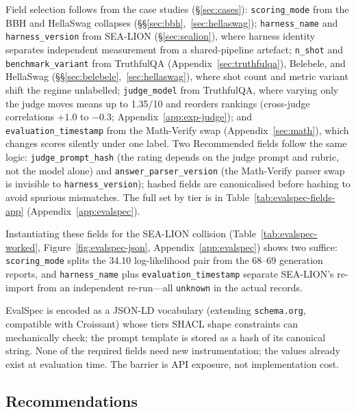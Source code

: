 \documentclass[11pt]{article}
\begin{document}
Field selection follows from the case studies (\S\ref{sec:cases}):
\texttt{scoring\_mode} from the BBH and HellaSwag collapses
(\S\S\ref{sec:bbh},~\ref{sec:hellaswag}); \texttt{harness\_name} and
\texttt{harness\_version} from SEA-LION (\S\ref{sec:sealion}), where harness
identity separates independent measurement from a shared-pipeline artefact;
\texttt{n\_shot} and \texttt{benchmark\_variant} from TruthfulQA
(Appendix~\ref{sec:truthfulqa}), Belebele, and HellaSwag
(\S\S\ref{sec:belebele},~\ref{sec:hellaswag}), where shot count and
metric variant shift the regime unlabelled; \texttt{judge\_model} from TruthfulQA,
where varying only the judge moves means up to 1.35/10 and reorders rankings
(cross-judge correlations $+1.0$ to $-0.3$; Appendix~\ref{app:exp-judge}); and
\texttt{evaluation\_timestamp} from the Math-Verify swap (Appendix~\ref{sec:math}), which
changes scores silently under one label. Two Recommended fields follow the same
logic: \texttt{judge\_prompt\_hash} (the rating depends on the judge prompt and
rubric, not the model alone) and \texttt{answer\_parser\_version} (the Math-Verify parser
swap is invisible to \texttt{harness\_version}); hashed fields are canonicalised
before hashing to avoid spurious mismatches. The full set by tier is in
Table~\ref{tab:evalspec-fields-app}
(Appendix~\ref{app:evalspec}).

Instantiating these fields for the SEA-LION collision
(Table~\ref{tab:evalspec-worked}, Figure~\ref{fig:evalspec-json},
Appendix~\ref{app:evalspec}) shows two suffice: \texttt{scoring\_mode} splits the
34.10 log-likelihood pair from the 68--69 generation reports, and
\texttt{harness\_name} plus \texttt{evaluation\_timestamp} separate SEA-LION's
re-import from an independent re-run---all \texttt{unknown} in the actual records.

EvalSpec is encoded as a JSON-LD vocabulary (extending \texttt{schema.org},
compatible with Croissant) whose tiers SHACL shape constraints can mechanically
check; the prompt template is stored as a hash of its canonical string. None of
the required fields need new instrumentation; the values already exist at
evaluation time. The barrier is API exposure, not implementation cost.


\subsection{Recommendations}
\label{sec:recs}
\end{document}
